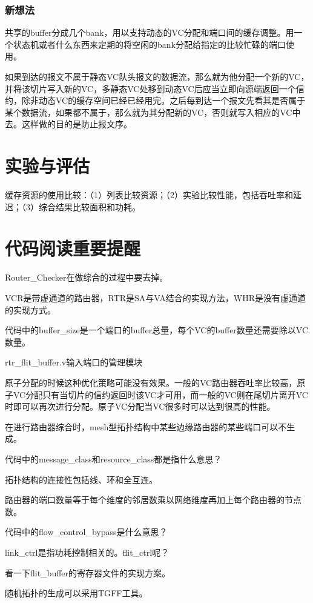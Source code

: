\documentclass[10pt,journal]{IEEEtran}
\begin{document}
\subsubsection{新想法}
共享的buffer分成几个bank，用以支持动态的VC分配和端口间的缓存调整。用一个状态机或者什么东西来定期的将空闲的bank分配给指定的比较忙碌的端口使用。

如果到达的报文不属于静态VC队头报文的数据流，那么就为他分配一个新的VC，并将该切片写入新的VC，多静态VC处移到动态VC后应当立即向源端返回一个信约，除非动态VC的缓存空间已经已经用完。之后每到达一个报文先看其是否属于某个数据流，如果都不属于，那么就为其分配新的VC，否则就写入相应的VC中去。这样做的目的是防止报文序。

\section{实验与评估}
缓存资源的使用比较：（1）列表比较资源；（2）实验比较性能，包括吞吐率和延迟；（3）综合结果比较面积和功耗。

\section{代码阅读重要提醒}
Router\_Checker在做综合的过程中要去掉。

VCR是带虚通道的路由器，RTR是SA与VA结合的实现方法，WHR是没有虚通道的实现方式。

代码中的buffer\_size是一个端口的buffer总量，每个VC的buffer数量还需要除以VC数量。

rtr\_flit\_buffer.v输入端口的管理模块

原子分配的时候这种优化策略可能没有效果。一般的VC路由器吞吐率比较高，原子VC分配只有当切片的信约返回时该VC才可用，而一般的VC则在尾切片离开VC时即可以再次进行分配。原子VC分配当VC很多时可以达到很高的性能。

在进行路由器综合时，mesh型拓扑结构中某些边缘路由器的某些端口可以不生成。

代码中的message\_class和resource\_class都是指什么意思？

拓扑结构的连接性包括线、环和全互连。

路由器的端口数量等于每个维度的邻居数乘以网络维度再加上每个路由器的节点数。

代码中的flow\_control\_bypass是什么意思？

link\_ctrl是指功耗控制相关的。flit\_ctrl呢？

看一下flit\_buffer的寄存器文件的实现方案。

随机拓扑的生成可以采用TGFF工具。
\end{document}
